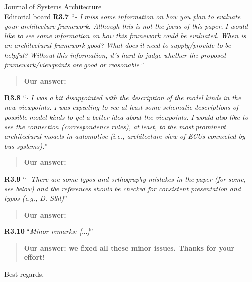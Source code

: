\documentclass[a4paper,10pt]{letter}
\begin{document}
\begin{letter}{Journal of Systems Architecture\\
    Editorial board}
\textbf{R3.7} ``\textit{- I miss some information on how you plan to evaluate your architecture framework. Although this is not the focus of this paper, I would like to see some information on how this framework could be evaluated. When is an architectural framework good? What does it need to supply/provide to be helpful? Without this information, it's hard to judge whether the proposed framework/viewpoints are good or reasonable.}''
\begin{quote}
\textbf{Our answer: }
\end{quote}

\textbf{R3.8} ``\textit{- I was a bit disappointed with the description of the model kinds in the new viewpoints. I was expecting to see at least some schematic descriptions of possible model kinds to get a better idea about the viewpoints. I would also like to see the connection (correspondence rules), at least, to the most prominent architectural models in automotive (i.e., architecture view of ECUs connected by bus systems).}''
\begin{quote}
\textbf{Our answer: }
\end{quote}

\textbf{R3.9} ``\textit{- There are some typos and orthography mistakes in the paper (for some, see below) and the references should be checked for consistent presentation and typos (e.g., D. Sthl)}''
\begin{quote}
\textbf{Our answer: }
\end{quote}

\textbf{R3.10} ``\textit{Minor remarks: [...]}''
\begin{quote}
\textbf{Our answer: we fixed all these minor issues. Thanks for your effort!}
\end{quote}

\hrulefill

\vfill

\closing{Best regards,}

%
%

\end{letter}
\end{document}
